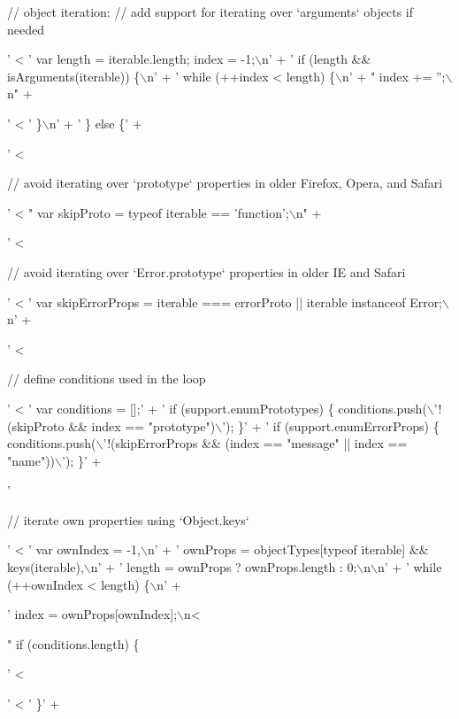 \begin{DoxyCodeInclude}
{{{{{{{{      \textcolor{comment}{// object iteration:}
      \textcolor{comment}{// add support for iterating over `arguments` objects if needed}
      \textcolor{stringliteral}{'  <%
      \textcolor{stringliteral}{'  var length = iterable.length; index = -1;\(\backslash\)n'} +
      \textcolor{stringliteral}{'  if (length && isArguments(iterable)) \{\(\backslash\)n'} +
      \textcolor{stringliteral}{'    while (++index < length) \{\(\backslash\)n'} +
      \textcolor{stringliteral}{"      index += '';\(\backslash\)n"} +
      \textcolor{stringliteral}{'      <%
      \textcolor{stringliteral}{'    \}\(\backslash\)n'} +
      \textcolor{stringliteral}{'  \} else \{'} +
      \textcolor{stringliteral}{'  <%

      \textcolor{comment}{// avoid iterating over `prototype` properties in older Firefox, Opera, and Safari}
      \textcolor{stringliteral}{'  <%
      \textcolor{stringliteral}{"  var skipProto = typeof iterable == 'function';\(\backslash\)n"} +
      \textcolor{stringliteral}{'  <%

      \textcolor{comment}{// avoid iterating over `Error.prototype` properties in older IE and Safari}
      \textcolor{stringliteral}{'  <%
      \textcolor{stringliteral}{'  var skipErrorProps = iterable === errorProto || iterable instanceof Error;\(\backslash\)n'} +
      \textcolor{stringliteral}{'  <%

      \textcolor{comment}{// define conditions used in the loop}
      \textcolor{stringliteral}{'  <%
      \textcolor{stringliteral}{'    var conditions = [];'} +
      \textcolor{stringliteral}{'    if (support.enumPrototypes) \{ conditions.push(\(\backslash\)'!(skipProto && index == "prototype")\(\backslash\)'); \}'} +
      \textcolor{stringliteral}{'    if (support.enumErrorProps)  \{ conditions.push(\(\backslash\)'!(skipErrorProps && (index == "message" ||
       index == "name"))\(\backslash\)'); \}'} +
      \textcolor{stringliteral}{'  %

      \textcolor{comment}{// iterate own properties using `Object.keys`}
      \textcolor{stringliteral}{'  <%
      \textcolor{stringliteral}{'  var ownIndex = -1,\(\backslash\)n'} +
      \textcolor{stringliteral}{'      ownProps = objectTypes[typeof iterable] && keys(iterable),\(\backslash\)n'} +
      \textcolor{stringliteral}{'      length = ownProps ? ownProps.length : 0;\(\backslash\)n\(\backslash\)n'} +
      \textcolor{stringliteral}{'  while (++ownIndex < length) \{\(\backslash\)n'} +
      \textcolor{stringliteral}{'    index = ownProps[ownIndex];\(\backslash\)n<%
      \textcolor{stringliteral}{"    if (conditions.length) \{ %
      \textcolor{stringliteral}{'    <%
      \textcolor{stringliteral}{'    <%
      \textcolor{stringliteral}{'  \}'} +

}}}}}}}}}}}}}}}}}}}}}}
\end{DoxyCodeInclude}
